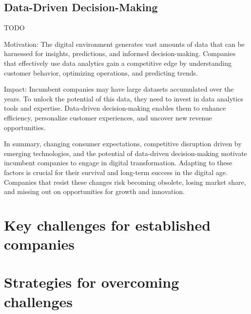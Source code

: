 \documentclass[a4]{scrartcl}
\begin{document}
\subsection{Data-Driven Decision-Making} \label{subsec:DataDrivenDecisionMaking}

	TODO

	Motivation: The digital environment generates vast amounts of data that can be harnessed for insights, predictions, and informed decision-making. Companies that effectively use data analytics gain a competitive edge by understanding customer behavior, optimizing operations, and predicting trends.
	
	
	Impact: Incumbent companies may have large datasets accumulated over the years. To unlock the potential of this data, they need to invest in data analytics tools and expertise. Data-driven decision-making enables them to enhance efficiency, personalize customer experiences, and uncover new revenue opportunities.
	
	
	
	In summary, changing consumer expectations, competitive disruption driven by emerging technologies, and the potential of data-driven decision-making motivate incumbent companies to engage in digital transformation. Adapting to these factors is crucial for their survival and long-term success in the digital age. Companies that resist these changes risk becoming obsolete, losing market share, and missing out on opportunities for growth and innovation.
	
	








\section{Key challenges for established companies} \label{sec:Sec2}












\section{Strategies for overcoming challenges} \label{sec:Sec3}












	
\newpage
{}
\begin{spacing}{0.9}
	\printbibliography
\end{spacing}


	
	
	
	
	
	
\end{document}
